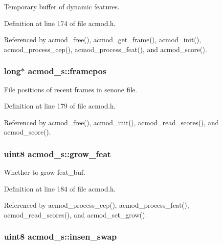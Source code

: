 Temporary buffer of dynamic features. 



Definition at line 174 of file acmod.\-h.



Referenced by acmod\-\_\-free(), acmod\-\_\-get\-\_\-frame(), acmod\-\_\-init(), acmod\-\_\-process\-\_\-cep(), acmod\-\_\-process\-\_\-feat(), and acmod\-\_\-score().

\subsubsection[{framepos}]{\setlength{\rightskip}{0pt plus 5cm}long$\ast$ acmod\-\_\-s\-::framepos}\label{structacmod__s_abfd364dafee513f523e1566bb706e48b}


File positions of recent frames in senone file. 



Definition at line 179 of file acmod.\-h.



Referenced by acmod\-\_\-free(), acmod\-\_\-init(), acmod\-\_\-read\-\_\-scores(), and acmod\-\_\-score().

\subsubsection[{grow\-\_\-feat}]{\setlength{\rightskip}{0pt plus 5cm}uint8 acmod\-\_\-s\-::grow\-\_\-feat}\label{structacmod__s_acbb3fed9495e7b80da79cb03ff3079a1}


Whether to grow feat\-\_\-buf. 



Definition at line 184 of file acmod.\-h.



Referenced by acmod\-\_\-process\-\_\-cep(), acmod\-\_\-process\-\_\-feat(), acmod\-\_\-read\-\_\-scores(), and acmod\-\_\-set\-\_\-grow().

\subsubsection[{insen\-\_\-swap}]{\setlength{\rightskip}{0pt plus 5cm}uint8 acmod\-\_\-s\-::insen\-\_\-swap}\label{structacmod__s_ae6ed7e1e5b4bec021a0ba17c0ac02bd7}


